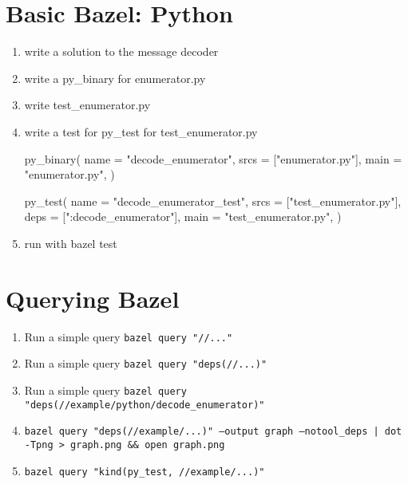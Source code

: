 \documentclass{article}
\begin{document}
\section{Basic Bazel: Python}
\begin{enumerate}
    \item write a solution to the message decoder
    \item write a py\_binary for enumerator.py
    \item write test\_enumerator.py
    \item write a test for py\_test for test\_enumerator.py
\begin{bazel}
py_binary(
    name = "decode_enumerator",
    srcs = ["enumerator.py"],
    main = "enumerator.py",
)

py_test(
    name = "decode_enumerator_test",
    srcs = ["test_enumerator.py"],
    deps = [":decode_enumerator"],
    main = "test_enumerator.py",
)
\end{bazel}
    \item run with bazel test
\end{enumerate}


\section{Querying Bazel}
\begin{enumerate}
    \item Run a simple query \texttt{bazel query "//..."}
    \item Run a simple query \texttt{bazel query "deps(//...)"}
    \item Run a simple query \texttt{bazel query "deps(//example/python/decode\_enumerator)"}
    \item \texttt{bazel query "deps(//example/...)" --output graph --notool\_deps | dot -Tpng > graph.png \&\& open graph.png}
    \item \texttt{bazel query "kind(py\_test, //example/...)"}
\end{enumerate}
\end{document}
